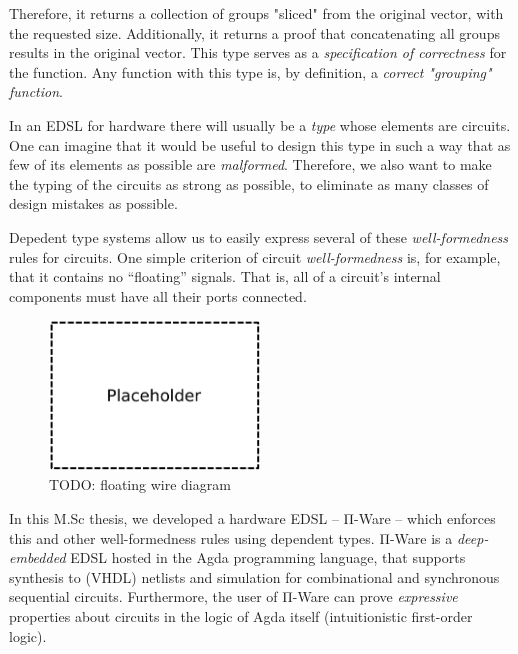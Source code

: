     Therefore, it returns a collection of groups "sliced" from the original vector, with the requested size.
    Additionally, it returns a proof that concatenating all groups results in the original vector.
    This type serves as a \emph{specification of correctness} for the function.
    Any function with this type is, by definition, a \emph{correct "grouping" function}.

    In an \ac{EDSL} for hardware there will usually be a \emph{type} whose elements are circuits.
    One can imagine that it would be useful to design this type
    in such a way that as few of its elements as possible are \emph{malformed}.
    Therefore, we also want to make the typing of the circuits as strong as possible,
    to eliminate as many classes of design mistakes as possible.


    Depedent type systems allow us to easily express several of these \emph{well-formedness} rules for circuits.
    One simple criterion of circuit \emph{well-formedness} is, for example, that it contains no ``floating'' signals.
    That is, all of a circuit's internal components must have all their ports connected. %

    \begin{figure}[h]
        \centerline{\includegraphics[width=0.5\textwidth]{imgs/floating-wire.pdf}}
        \caption{TODO: floating wire diagram \label{fig:floating-wire}}
    \end{figure}

    In this M.Sc thesis, we developed a hardware \ac{EDSL} -- Π-Ware -- which enforces this and other
    well-formedness rules using dependent types.
    Π-Ware is a \emph{deep-embedded} \ac{EDSL} hosted in the Agda programming language,
    that supports synthesis to (\acs{VHDL}) netlists and simulation for combinational and synchronous sequential circuits.
    Furthermore, the user of Π-Ware can prove \emph{expressive} properties about circuits in the logic
    of Agda itself (intuitionistic first-order logic).

